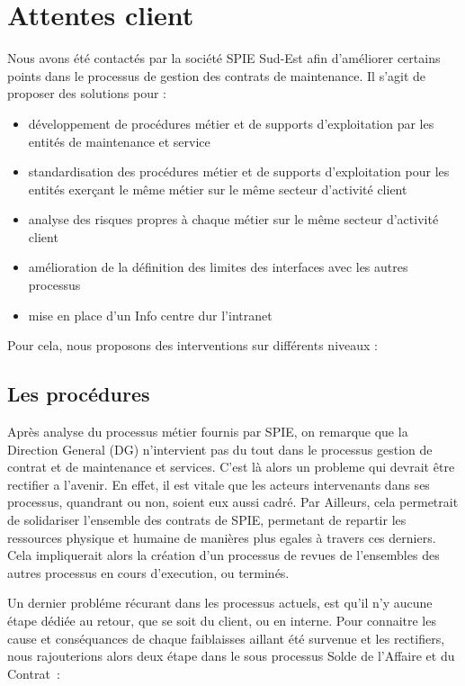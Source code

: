 \chapter{Attentes client}

Nous avons été contactés par la société SPIE Sud-Est afin d'améliorer certains points dans le processus de gestion des contrats de maintenance. Il s'agit de proposer des solutions pour :

\begin{itemize}
    \item développement de procédures métier et de supports d'exploitation par les entités de maintenance et service
    \item standardisation des procédures métier et de supports d'exploitation pour les entités exerçant le même métier sur le même secteur d'activité client
    \item analyse des risques propres à chaque métier sur le même secteur d'activité client
    \item amélioration de la définition des limites des interfaces avec les autres processus
    \item mise en place d'un Info centre dur l'intranet
\end{itemize}

Pour cela, nous proposons des interventions sur différents niveaux :


\section{Les procédures}

Apr\`es analyse du processus m\'etier fournis par SPIE, on remarque que la Direction General (DG) n'intervient
pas du tout dans le processus gestion de contrat et de maintenance et services. C'est l\`a alors un probleme
qui devrait \^etre rectifier a l'avenir. En effet, il est vitale que les acteurs intervenants dans ses processus,
quandrant ou non, soient eux aussi cadr\'e. Par Ailleurs, cela permetrait de solidariser l'ensemble des contrats de SPIE, permetant de repartir les ressources
physique et humaine de mani\`eres plus egales \`a travers ces derniers. Cela impliquerait alors la cr\'eation d'un processus
de revues de l'ensembles des autres processus en cours d'execution, ou termin\'es.

Un dernier probl\'eme r\'ecurant dans les processus actuels, est qu'il n'y aucune \'etape d\'edi\'ee au retour, que
se soit du client, ou en interne. Pour connaitre les cause et cons\'equances de chaque faiblaisses aillant \'et\'e survenue
et les rectifiers, nous rajouterions alors deux \'etape dans le sous processus Solde de l'Affaire et du Contrat~:

